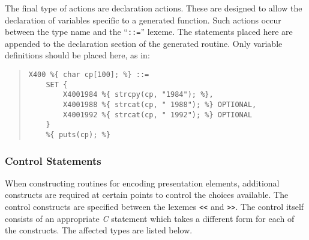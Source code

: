 The final type of actions are declaration actions.
These are designed to
allow the declaration of variables specific to a generated function.
Such actions occur between the type name and the ``\verb"::="'' lexeme.
The statements placed here are appended to the declaration section of
the generated routine.  Only variable definitions should be placed
here, as in:
\begin{quote}\small\begin{verbatim}
X400 %{ char cp[100]; %} ::=
    SET {
        X4001984 %{ strcpy(cp, "1984"); %},
        X4001988 %{ strcat(cp, " 1988"); %} OPTIONAL,
        X4001992 %{ strcat(cp, " 1992"); %} OPTIONAL
    }
    %{ puts(cp); %}
\end{verbatim}\end{quote}

\subsubsection	{Control Statements}
When constructing routines for encoding presentation elements,
additional constructs are required at certain points to control
the choices available. The control constructs are specified between
the lexemes
\verb"<<" and \verb">>". The control itself consists of an appropriate
{\em C\/} statement which takes a different form for each of the constructs.
The affected types are listed below.
